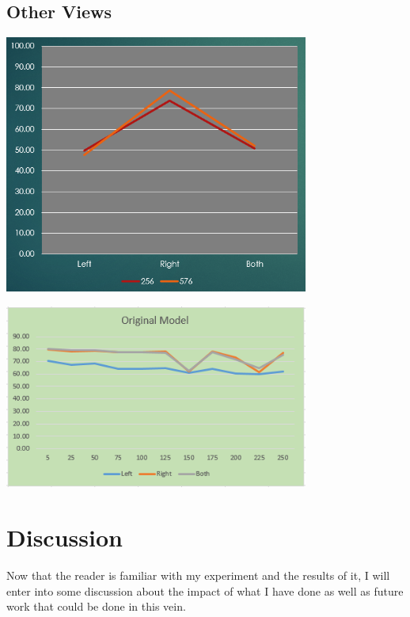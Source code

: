 \documentclass[]{report}
\begin{document}
\section{Other Views}

\begin{minipage}{\linewidth}
	\begin{minipage}{0.49\textwidth}
		\centering
		\includegraphics[width=0.75\textwidth]{../accuracy-deep}
	\end{minipage}
	\hfill
	\begin{minipage}{0.49\textwidth}
		\centering
		\includegraphics[width=0.75\textwidth]{../handed-original}
	\end{minipage}
\end{minipage}

\chapter{Discussion}

Now that the reader is familiar with my experiment and the results of it, I will enter into some discussion about the impact of what I have done as well as future work that could be done in this vein.
\end{document}
